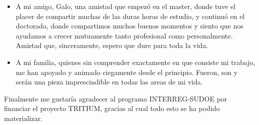 \begin{itemize}
\item{} A mi amigo, Galo, una amistad que empezó en el master, donde tuve el placer de compartir muchas de las duras horas de estudio, y continuó en el doctorado, donde compartimos muchos buenos momentos y siento que nos ayudamos a crecer mutuamente tanto profesional como personalmente. Amistad que, sinceramente, espero que dure para toda la vida.

\item{} A mi familia, quienes sin comprender exactamente en que consiste mi trabajo, me han apoyado y animado ciegamente desde el principio. Fueron, son y serán una pieza imprescindible en todas las areas de mi vida.

\end{itemize} 

Finalmente me gustaría agradecer al programa INTERREG-SUDOE por financiar el proyecto TRITIUM, gracias al cual todo esto se ha podido materializar.